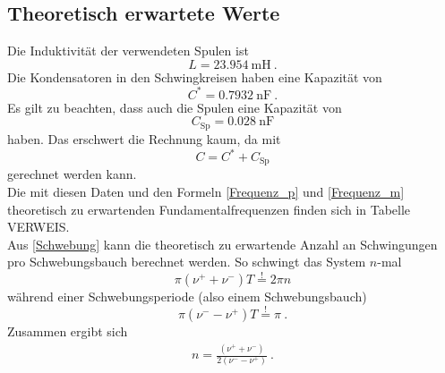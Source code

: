 \subsection{Theoretisch erwartete Werte}
Die Induktivität der verwendeten Spulen ist
\[ L = \SI{23.954}{\milli\henry} \ . \]
Die Kondensatoren in den Schwingkreisen haben eine Kapazität von
\[ C^* = \SI{0.7932}{\nano\farad} \ . \]
Es gilt zu beachten, dass auch die Spulen eine Kapazität von
\[ C_\text{Sp} = \SI{0.028}{\nano\farad} \]
haben. Das erschwert die Rechnung kaum, da mit
\[ C = C^* + C_\text{Sp} \]
gerechnet werden kann. \\
Die mit diesen Daten und den Formeln \eqref{Frequenz_p} und \eqref{Frequenz_m} theoretisch zu erwartenden Fundamentalfrequenzen finden sich in Tabelle VERWEIS. \\
Aus \eqref{Schwebung} kann die theoretisch zu erwartende Anzahl an Schwingungen pro Schwebungsbauch berechnet werden. So schwingt das System $n$-mal
\[ \pi(\nu^+ + \nu^-)T \overset{!}{=} 2\pi n \]
während einer Schwebungsperiode (also einem Schwebungsbauch)
\[ \pi(\nu^- - \nu^+)T \overset{!}{=} \pi \ . \]
Zusammen ergibt sich
\begin{align}\label{Bauch}
	n = \frac{(\nu^+ + \nu^-)}{2(\nu^- - \nu^+)} \ .
\end{align}